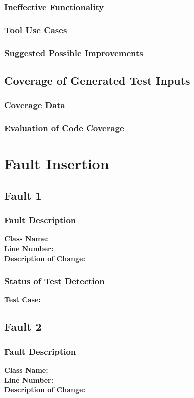 \documentclass[letterpaper,10pt]{article}
\begin{document}
		\subsubsection{Ineffective Functionality}
		\subsubsection{Tool Use Cases}
		\subsubsection{Suggested Possible Improvements}
	\subsection{Coverage of Generated Test Inputs}
		\subsubsection{Coverage Data}
		\subsubsection{Evaluation of Code Coverage}
\section{Fault Insertion}
	\subsection{Fault 1}
		\subsubsection{Fault Description}
		\textbf{Class Name: } \\
		\textbf{Line Number: } \\
		\textbf{Description of Change: } \\
		\subsubsection{Status of Test Detection}
		\textbf{Test Case: } \\
	\subsection{Fault 2}
		\subsubsection{Fault Description}
		\textbf{Class Name: } \\
		\textbf{Line Number: } \\
		\textbf{Description of Change: } \\
\end{document}
